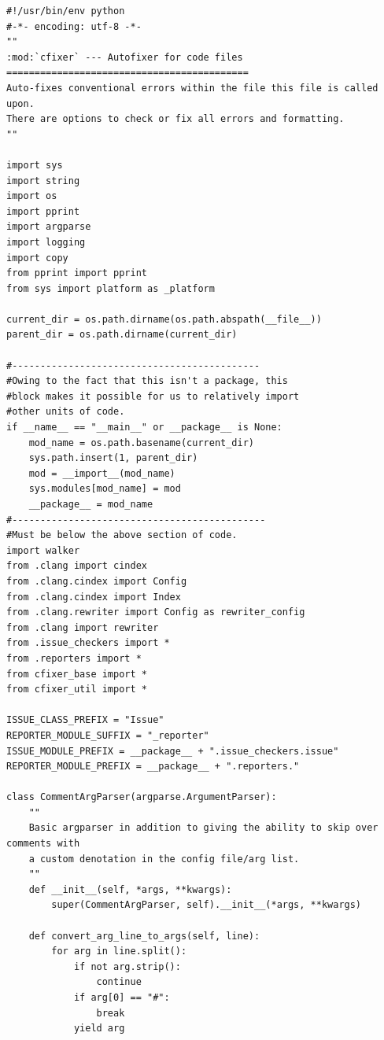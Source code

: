 \documentclass[11pt]{scrreprt}
\begin{document}
\begin{lstlisting}[frame=single,basicstyle=\small]
#!/usr/bin/env python
#-*- encoding: utf-8 -*-
""
:mod:`cfixer` --- Autofixer for code files
===========================================
Auto-fixes conventional errors within the file this file is called upon.
There are options to check or fix all errors and formatting.
""

import sys
import string
import os
import pprint
import argparse
import logging
import copy
from pprint import pprint
from sys import platform as _platform

current_dir = os.path.dirname(os.path.abspath(__file__))
parent_dir = os.path.dirname(current_dir)

#--------------------------------------------
#Owing to the fact that this isn't a package, this
#block makes it possible for us to relatively import
#other units of code.
if __name__ == "__main__" or __package__ is None:
    mod_name = os.path.basename(current_dir)
    sys.path.insert(1, parent_dir)
    mod = __import__(mod_name)
    sys.modules[mod_name] = mod
    __package__ = mod_name
#---------------------------------------------
#Must be below the above section of code.
import walker
from .clang import cindex
from .clang.cindex import Config
from .clang.cindex import Index
from .clang.rewriter import Config as rewriter_config
from .clang import rewriter
from .issue_checkers import *
from .reporters import *
from cfixer_base import *
from cfixer_util import *

ISSUE_CLASS_PREFIX = "Issue"
REPORTER_MODULE_SUFFIX = "_reporter"
ISSUE_MODULE_PREFIX = __package__ + ".issue_checkers.issue"
REPORTER_MODULE_PREFIX = __package__ + ".reporters."

class CommentArgParser(argparse.ArgumentParser):
    ""
    Basic argparser in addition to giving the ability to skip over comments with
    a custom denotation in the config file/arg list.
    ""
    def __init__(self, *args, **kwargs):
        super(CommentArgParser, self).__init__(*args, **kwargs)

    def convert_arg_line_to_args(self, line):
        for arg in line.split():
            if not arg.strip():
                continue
            if arg[0] == "#":
                break
            yield arg



\end{lstlisting}
\end{document}
